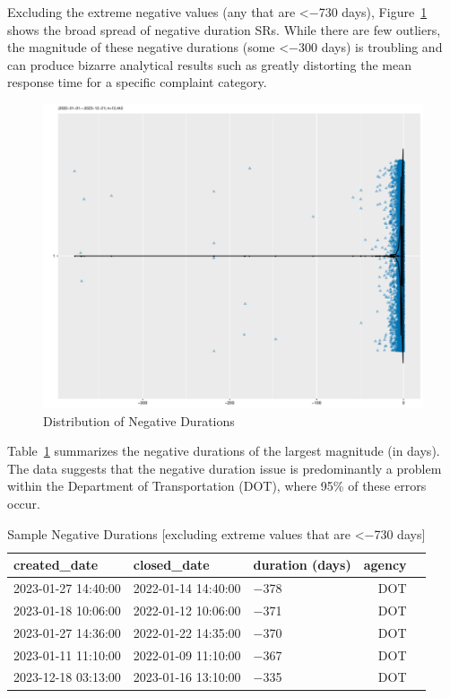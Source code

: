 \documentclass[linenumber]{jdsart}
\begin{document}
Excluding the extreme negative values (any that are <$-$730 days), 
Figure~\ref{fig:negative-duration-violin} shows the broad spread of 
negative duration SRs. While there are few outliers, the magnitude 
of these negative durations (some <$-$300 days) is troubling 
and can produce bizarre analytical results such as greatly 
distorting the mean response time for a specific complaint category.

\begin{figure}[tbp]
	 \centering
 	 \includegraphics[width=\textwidth]{negative_duration_SR_violin.pdf}
 \caption{Distribution of Negative Durations}
 \label{fig:negative-duration-violin}
\end{figure}

Table~\ref{tab:largest-errors} summarizes the 
negative durations of the largest magnitude (in days). The data 
suggests that the negative duration issue is predominantly a problem 
within the Department of Transportation (DOT), where 95\% of these 
errors occur.

\begin{table}[tbp]
  \centering
  \caption{Sample  Negative Durations [excluding extreme values that are <$-$730 days]}
   \label{tab:largest-errors}
 	\begin{tabular}{l l l r l}
    \toprule
    {created\_date} & {closed\_date} & {duration (days)}  & {agency} \\
    \midrule
    2023-01-27 14:40:00 & 2022-01-14 14:40:00 & $-$378 & DOT \\
    2023-01-18 10:06:00 & 2022-01-12 10:06:00 & $-$371 & DOT \\
    2023-01-27 14:36:00 & 2022-01-22 14:35:00 & $-$370 & DOT \\
    2023-01-11 11:10:00 & 2022-01-09 11:10:00 & $-$367 & DOT \\
    2023-12-18 03:13:00 & 2023-01-16 13:10:00 & $-$335 & DOT \\
    \bottomrule
    \end{tabular}
 \end{table}
\end{document}
